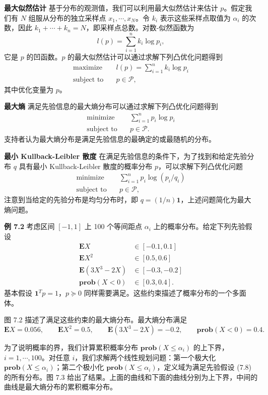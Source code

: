 \documentclass[UTF8, 12pt, fontset=fandol, oneside]{ctexart}
\begin{document}
\noindent\textbf{最大似然估计}\quad
基于分布的观测值，我们可以利用最大似然估计来估计 $p$。假定我们有 $N$ 组服从分布的独立采样点 $x_1,\cdots,x_N$。令 $k_i$ 表示这些采样点取值为 $\alpha_i$ 的次数，因此 $k_1+\cdots+k_n=N$，即采样点总数。对数-似然函数为
\[
l(p)=\sum_{i=1}^n k_i\log p_i,
\]
它是 $p$ 的凹函数。$p$ 的最大似然估计可以通过求解下列凸优化问题得到
\[
\begin{aligned}
\text{maximize}\quad & l(p)=\sum_{i=1}^n k_i\log p_i\\
\text{subject to}\quad & p\in\mathcal{P},
\end{aligned}
\]
其中优化变量为 $p$。

\noindent\textbf{最大熵}\quad
满足先验信息的最大熵分布可以通过求解下列凸优化问题得到
\[
\begin{aligned}
\text{minimize}\quad & \sum_{i=1}^n p_i\log p_i\\
\text{subject to}\quad & p\in\mathcal{P}.
\end{aligned}
\]
支持者认为最大熵分布是满足先验信息的最确定的或最随机的分布。

\noindent\textbf{最小 Kullback-Leibler 散度}\quad
在满足先验信息的条件下，为了找到和给定先验分布 $q$ 具有最小 Kullback-Leibler 散度的概率分布 $p$，可以求解下列凸优化问题
\[
\begin{aligned}
\text{minimize}\quad & \sum_{i=1}^n p_i\log(p_i/q_i)\\
\text{subject to}\quad & p\in\mathcal{P},
\end{aligned}
\]
注意到当给定的先验分布是均匀分布时，即 $q=(1/n)\mathbf{1}$，上述问题简化为最大熵问题。

\noindent\textbf{例 7.2}\quad
考虑区间 $[-1,1]$ 上 100 个等间距点 $\alpha_i$ 上的概率分布。给定下列先验假设
\begin{equation}
\begin{aligned}
\mathbf{E}X&\in[-0.1,0.1]\\
\mathbf{E}X^2&\in[0.5,0.6]\\
\mathbf{E}(3X^3-2X)&\in[-0.3,-0.2]\\
\mathbf{prob}(X<0)&\in[0.3,0.4].
\end{aligned}
\tag{7.8}
\end{equation}
基本假设 $\mathbf{1}^Tp=1$，$p\succeq 0$ 同样需要满足。这些约束描述了概率分布的一个多面体。

图 7.2 描述了满足这些约束的最大熵分布。最大熵分布满足
\[
\mathbf{E}X=0.056,\qquad
\mathbf{E}X^2=0.5,\qquad
\mathbf{E}(3X^3-2X)=-0.2,\qquad
\mathbf{prob}(X<0)=0.4.
\]

为了说明概率的界，我们计算累积概率分布 $\mathbf{prob}(X\leq \alpha_i)$ 的上下界，$i=1,\cdots,100$。对任意 $i$，我们求解两个线性规划问题：第一个极大化 $\mathbf{prob}(X\leq \alpha_i)$；第二个极小化 $\mathbf{prob}(X\leq \alpha_i)$，定义域为满足先验假设 (7.8) 的所有分布。图 7.3 给出了结果。上面的曲线和下面的曲线分别为上下界，中间的曲线是最大熵分布的累积概率分布。
\end{document}
